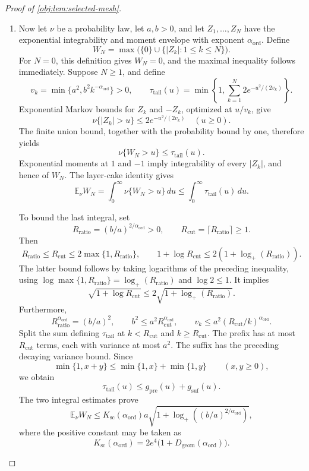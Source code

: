 \begin{proof}[Proof of \cref{obj:lem:selected-mesh}]
\begin{enumerate}
\item Now let \(\nu\) be a probability law, let \(a,b>0\), and let
\(Z_1,\ldots,Z_N\) have the exponential integrability and moment envelope
with exponent \(\alpha_{\mathrm{ord}}\). Define
\[
W_N=\max\bigl(\{0\}\cup\{|Z_k|:1\le k\le N\}\bigr).
\]
For \(N=0\), this definition gives \(W_N=0\), and the maximal inequality
follows immediately. Suppose \(N\ge1\), and define
\[
v_k=\min\{a^2,b^2k^{-\alpha_{\mathrm{ord}}}\}>0,
\qquad
\tau_{\mathrm{tail}}(u)=\min\!\left\{1,\sum_{k=1}^{N}2e^{-u^2/(2v_k)}\right\}.
\]
Exponential Markov bounds for \(Z_k\) and \(-Z_k\), optimized at
\(u/v_k\), give
\[
\nu\{|Z_k|>u\}\le2e^{-u^2/(2v_k)}
\quad(u\ge0).
\]
The finite union bound, together with the probability bound by one,
therefore yields
\[
\nu\{W_N>u\}\le\tau_{\mathrm{tail}}(u).
\]
Exponential moments at \(1\) and \(-1\) imply integrability of every
\(|Z_k|\), and hence of \(W_N\). The layer-cake identity gives
\[
\mathbb E_\nu W_N
=
\int_0^\infty\nu\{W_N>u\}\,du
\le\int_0^\infty\tau_{\mathrm{tail}}(u)\,du.
\]

To bound the last integral, set
\[
R_{\mathrm{ratio}}=(b/a)^{2/\alpha_{\mathrm{ord}}}>0,
\qquad
R_{\mathrm{cut}}=\lceil R_{\mathrm{ratio}}\rceil\ge1.
\]
Then
\[
R_{\mathrm{ratio}}\le R_{\mathrm{cut}}
\le2\max\{1,R_{\mathrm{ratio}}\},
\qquad
1+\log R_{\mathrm{cut}}
\le2(1+\log_+(R_{\mathrm{ratio}})).
\]
The latter bound follows by taking logarithms of the preceding
inequality, using
\(\log\max\{1,R_{\mathrm{ratio}}\}
=\log_+(R_{\mathrm{ratio}})\) and \(\log2\le1\).
It implies
\[
\sqrt{1+\log R_{\mathrm{cut}}}
\le2\sqrt{1+\log_+(R_{\mathrm{ratio}})}.
\]
Furthermore,
\[
R_{\mathrm{ratio}}^{\alpha_{\mathrm{ord}}}=(b/a)^2,
\qquad
b^2\le a^2R_{\mathrm{cut}}^{\alpha_{\mathrm{ord}}},
\qquad
v_k\le a^2(R_{\mathrm{cut}}/k)^{\alpha_{\mathrm{ord}}}.
\]
Split the sum defining \(\tau_{\mathrm{tail}}\) at \(k<R_{\mathrm{cut}}\) and
\(k\ge R_{\mathrm{cut}}\). The prefix has at most \(R_{\mathrm{cut}}\)
terms, each with variance at most \(a^2\). The suffix has the preceding
decaying variance bound. Since
\[
\min\{1,x+y\}\le\min\{1,x\}+\min\{1,y\}
\qquad(x,y\ge0),
\]
we obtain
\[
\tau_{\mathrm{tail}}(u)\le g_{\mathrm{pre}}(u)+g_{\mathrm{suf}}(u).
\]
The two integral estimates prove
\[
\mathbb E_\nu W_N
\le
K_{\mathrm{sc}}(\alpha_{\mathrm{ord}})
a\sqrt{1+\log_+((b/a)^{2/\alpha_{\mathrm{ord}}})},
\]
where the positive constant may be taken as
\[
K_{\mathrm{sc}}(\alpha_{\mathrm{ord}})
=
2e^4\bigl(1+D_{\mathrm{geom}}(\alpha_{\mathrm{ord}})\bigr).
\]


\end{enumerate}
\end{proof}
